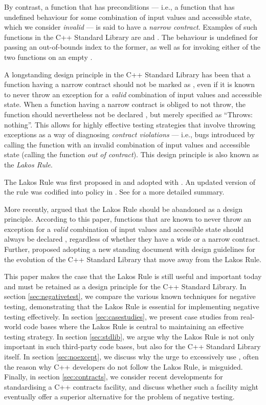 By contrast, a function that has preconditions --- i.e., a function that has undefined behaviour for some combination of input values and accessible state, which we consider \emph{invalid} --- is said to have a \emph{narrow contract}. Examples of such functions in the C++ Standard Library are  and . The behaviour is undefined for passing an out-of-bounds index to the former, as well as for invoking either of the two functions on an empty .

A longstanding design principle in the C++ Standard Library has been that a function having a narrow contract should not be marked as , even if it is known to never throw an exception for a \emph{valid} combination of input values and accessible state. When a function having a narrow contract is obliged to not throw, the function should nevertheless not be declared , but merely specified as ``Throws: nothing''. This allows for highly effective testing strategies that involve throwing exceptions as a way of diagnosing \emph{contract violations} --- i.e., bugs introduced by calling the function with an invalid combination of input values and accessible state (calling the function \emph{out of contract}). This design principle is also known as the \emph{Lakos Rule}.

The Lakos Rule was first proposed in \cite{N3248} and adopted with \cite{N3279}. An updated version of the rule was codified into policy in \cite{P0884R0}. See \cite{O'Dwyer2018} for a more detailed summary.

More recently, \cite{P1656R2} argued that the Lakos Rule should be abandoned as a design principle. According to this paper, functions that are known to never throw an exception for a \emph{valid} combination of input values and accessible state should always be declared , regardless of whether they have a wide or a narrow contract. Further, \cite{P2148R0} proposed adopting a new standing document with design guidelines for the evolution of the C++ Standard Library that move away from the Lakos Rule.

This paper makes the case that the Lakos Rule is still useful and important today and must be retained as a design principle for the C++ Standard Library. In section \ref{sec:negativetest}, we compare the various known techniques for negative testing, demonstrating that the Lakos Rule is essential for implementing negative testing effectively. In section \ref{sec:casestudies}, we present case studies from real-world code bases where the Lakos Rule is central to maintaining an effective testing strategy. In section \ref{sec:stdlib}, we argue why the Lakos Rule is not only important in such third-party code bases, but also for the C++ Standard Library itself. In section \ref{sec:noexcept}, we discuss why the urge to excessively use , often the reason why C++ developers do not follow the Lakos Rule, is misguided. Finally, in section \ref{sec:contracts}, we consider recent developments for standardising a C++ contracts facility, and discuss whether such a facility might eventually offer a superior alternative for the problem of negative testing.

